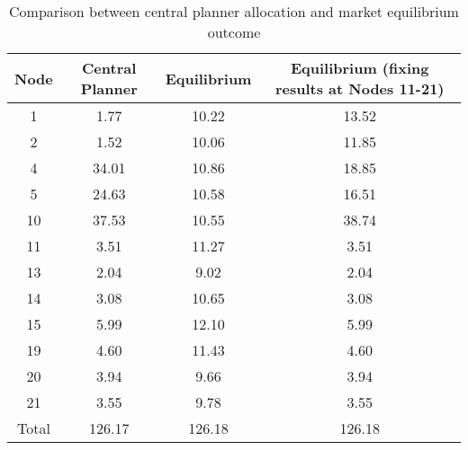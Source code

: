 \begin{table}[htbp]
  \centering
  \caption{Comparison between central planner allocation and market equilibrium outcome}
    \begin{tabular}{cccc}
    \toprule
    Node  & Central Planner & Equilibrium &  Equilibrium (fixing results at Nodes 11-21) \\
    \midrule
    1     & 1.77  & 10.22 & 13.52 \\
    2     & 1.52  & 10.06 & 11.85 \\
    4     & 34.01 & 10.86 & 18.85 \\
    5     & 24.63 & 10.58 & 16.51 \\
    10    & 37.53 & 10.55 & 38.74 \\
    11    & 3.51  & 11.27 & 3.51 \\
    13    & 2.04  & 9.02  & 2.04 \\
    14    & 3.08  & 10.65 & 3.08 \\
    15    & 5.99  & 12.10 & 5.99 \\
    19    & 4.60  & 11.43 & 4.60 \\
    20    & 3.94  & 9.66  & 3.94 \\
    21    & 3.55  & 9.78  & 3.55 \\
    Total & 126.17 & 126.18 & 126.18 \\
    \bottomrule
    \end{tabular}%
  \label{tab:comp_cent_equi}%
\end{table}%
%
